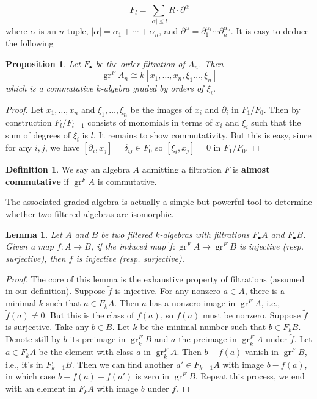 \documentclass[11pt, a4paper]{article}
\newtheorem{lemma}[theorem]{Lemma}
\newtheorem{proposition}[theorem]{Proposition}
\theoremstyle{definition}
\newtheorem{definition}[theorem]{Definition}
\newcommand{\gr}{\operatorname{gr}}
\begin{document}
    \[F_l=\sum_{|\alpha|\leqslant l}R\cdot\partial^\alpha\]
    where $\alpha$ is an $n$-tuple, $|\alpha|=\alpha_1+\cdots+\alpha_n$, and $\partial^\alpha=\partial_1^{\alpha_1}\cdots\partial_n^{\alpha_n}$. It is easy to deduce the following
    \begin{proposition}
        Let $F_\bullet$ be the order filtration of $A_n$. Then
        \[\gr^F A_n\cong k[x_1,\dots, x_n,\xi_1\dots, \xi_n]\]
        which is a commutative $k$-algebra graded by orders of $\xi_i$.
    \end{proposition}
    \begin{proof}
        Let $x_1,\dots, x_n$ and $\xi_1,\dots,\xi_n$ be the images of $x_i$ and $\partial_i$ in $F_1/F_0$. Then by construction $F_l/F_{l-1}$ consists of monomials in terms of $x_i$ and $\xi_i$ such that the sum of degrees of $\xi_i$ is $l$. It remains to show commutativity. But this is easy, since for any $i, j$, we have $[\partial_i, x_j]=\delta_{ij}\in F_0$ so $[\xi_i, x_j]=0$ in $F_{1}/F_0$.
    \end{proof}
    \begin{definition}\label{def-almost-comm}
        We say an algebra $A$ admitting a filtration $F$ is \textbf{almost commutative} if $\gr^F A$ is commutative.
    \end{definition}
    The associated graded algebra is actually a simple but powerful tool to determine whether two filtered algebras are isomorphic.
    \begin{lemma}\label{lem-gr-iso-is-iso}
        Let $A$ and $B$ be two filtered $k$-algebras with filtrations $F_\bullet A$ and $F_\bullet B$. Given a map $f:A\to B$, if the induced map $\tilde f:\gr^FA\to\gr^FB$ is injective (resp. surjective), then $f$ is injective (resp. surjective).
    \end{lemma}
    \begin{proof}
        The core of this lemma is the exhaustive property of filtrations (assumed in our definition). Suppose $\tilde f$ is injective. For any nonzero $a\in A$, there is a minimal $k$ such that $a\in F_kA$. Then $a$ has a nonzero image in $\gr^FA$, i.e., $\tilde f(a)\neq 0$. But this is the class of $f(a)$, so $f(a)$ must be nonzero. Suppose $\tilde f$ is surjective. Take any $b\in B$. Let $k$ be the minimal number such that $b\in F_kB$. Denote still by $b$ its preimage in $\gr^F_kB$ and $a$ the preimage in $\gr^F_kA$ under $\tilde f$. Let $a\in F_kA$ be the element with class $a$ in $\gr^F_kA$. Then $b-f(a)$ vanish in $\gr^FB$, i.e., it's in $F_{k-1}B$. Then we can find another $a'\in F_{k-1}A$ with image $b-f(a)$, in which case $b-f(a)-f(a')$ is zero in $\gr^FB$. Repeat this process, we end with an element in $F_kA$ with image $b$ under $f$.
    \end{proof}
\end{document}
